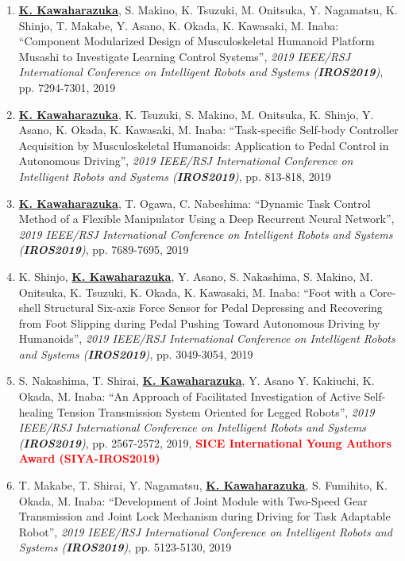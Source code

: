 \documentclass[letterpaper,11pt]{article}
\begin{document}
\begin{enumerate}
\item \underline{\textbf{K. Kawaharazuka}}, S. Makino, K. Tsuzuki, M. Onitsuka, Y. Nagamatsu, K. Shinjo, T. Makabe, Y. Asano, K. Okada, K. Kawasaki, M. Inaba: ``Component Modularized Design of Musculoskeletal Humanoid Platform Musashi to Investigate Learning Control Systems'', \textit{2019 IEEE/RSJ International Conference on Intelligent Robots and Systems (\textit{\textbf{IROS2019}})}, pp. 7294-7301, 2019
\item \underline{\textbf{K. Kawaharazuka}}, K. Tsuzuki, S. Makino, M. Onitsuka, K. Shinjo, Y. Asano, K. Okada, K. Kawasaki, M. Inaba: ``Task-specific Self-body Controller Acquisition by Musculoskeletal Humanoids: Application to Pedal Control in Autonomous Driving'', \textit{2019 IEEE/RSJ International Conference on Intelligent Robots and Systems (\textit{\textbf{IROS2019}})}, pp. 813-818, 2019
\item \underline{\textbf{K. Kawaharazuka}}, T. Ogawa, C. Nabeshima: ``Dynamic Task Control Method of a Flexible Manipulator Using a Deep Recurrent Neural Network'', \textit{2019 IEEE/RSJ International Conference on Intelligent Robots and Systems (\textit{\textbf{IROS2019}})}, pp. 7689-7695, 2019
\item K. Shinjo, \underline{\textbf{K. Kawaharazuka}}, Y. Asano, S. Nakashima, S. Makino, M. Onitsuka, K. Tsuzuki, K. Okada, K. Kawasaki, M. Inaba: ``Foot with a Core-shell Structural Six-axis Force Sensor for Pedal Depressing and Recovering from Foot Slipping during Pedal Pushing Toward Autonomous Driving by Humanoids'', \textit{2019 IEEE/RSJ International Conference on Intelligent Robots and Systems (\textit{\textbf{IROS2019}})}, pp. 3049-3054, 2019
\item S. Nakashima, T. Shirai, \underline{\textbf{K. Kawaharazuka}}, Y. Asano Y. Kakiuchi, K. Okada, M. Inaba: ``An Approach of Facilitated Investigation of Active Self-healing Tension Transmission System Oriented for Legged Robots'', \textit{2019 IEEE/RSJ International Conference on Intelligent Robots and Systems (\textit{\textbf{IROS2019}})}, pp. 2567-2572, 2019, \textbf{\textcolor{red}{SICE International Young Authors Award (SIYA-IROS2019)}}
\item T. Makabe, T. Shirai, Y. Nagamatsu, \underline{\textbf{K. Kawaharazuka}}, S. Fumihito, K. Okada, M. Inaba: ``Development of Joint Module with Two-Speed Gear Transmission and Joint Lock Mechanism during Driving for Task Adaptable Robot'', \textit{2019 IEEE/RSJ International Conference on Intelligent Robots and Systems (\textit{\textbf{IROS2019}})}, pp. 5123-5130, 2019

\end{enumerate}
\end{document}
